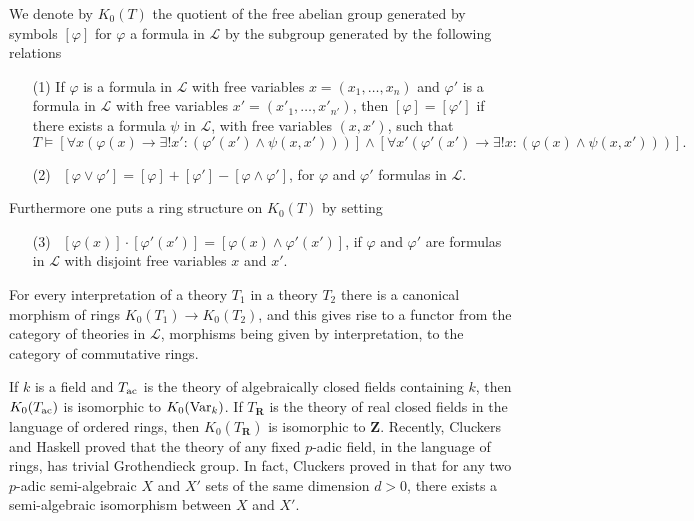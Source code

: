 \documentclass[english,12pt]{amsart}
\def\RR{{\mathbf R}}
\def\ZZ{{\mathbf Z}}
\def\cL{{\mathcal L}}
\theoremstyle{definition}
\theoremstyle{remark}
\theoremstyle{plain}
\numberwithin{equation}{subsection}
\def\RR{{\mathbf R}}
\def\ZZ{{\mathbf Z}}
\def\cL{{\mathcal L}}
\begin{document}
We denote by $K_{0} (T)$ the quotient of the
free abelian group generated by
symbols $[\varphi]$ for $\varphi$ a formula in $\cL$
by the subgroup generated by the following
relations~
\begin{enumerate}
\item[(1)] If $\varphi$ is a formula in $\cL$ with free variables
$x = (x_{1}, \ldots, x_{n})$ and
$\varphi'$ is a formula in $\cL$ with free variables
$x' = (x'_{1}, \ldots, x'_{n'})$, then
$[\varphi] = [\varphi']$ if there exists a formula
$\psi$ in $\cL$, with free variables
$(x, x')$,
such that
$$
T \models [\forall x (\varphi (x) \rightarrow \exists! x' : (\varphi' (x')
\wedge \psi (x, x')))]
\wedge
[\forall x' (\varphi' (x') \rightarrow \exists! x : (\varphi (x)
\wedge \psi (x, x')))].$$
\item[(2)] \, $[\varphi \vee \varphi'] = [\varphi] + [\varphi'] - [\varphi
\wedge \varphi']$, for $\varphi$ and $\varphi'$  formulas in $\cL$.
\end{enumerate}
Furthermore one puts a ring structure on 
$K_{0} (T)$ by setting
\begin{enumerate}
\item[(3)] \, $[\varphi (x) ] \cdot [\varphi' (x')] =
[\varphi (x) \wedge  \varphi' (x')] $, if
$\varphi$ and $\varphi'$  are formulas in $\cL$ with disjoint free
variables $x$ and $x'$.
\end{enumerate}



For every interpretation of a theory $T_{1}$ in a theory
$T_{2}$ there is  a canonical morphism of rings
$K_{0} (T_{1}) \rightarrow K_{0} (T_{2})$, and this gives rise to a functor
from the category of theories in $\cL$, morphisms being given by
interpretation, to the category of commutative rings.



\medskip


If $k$ is a field and $T_{\rm ac}$ is 
the theory of algebraically closed fields containing $k$,
then $K_{0} (T_{\rm ac})$ is isomorphic to $K_{0} ({\rm Var}_k)$. If
$T_{\RR}$ is the theory
of real closed fields in the language of ordered rings, 
then $K_{0} (T_{\RR})$ is isomorphic to $\ZZ$.
Recently, Cluckers and Haskell \cite{CH} proved that the theory of
any fixed $p$-adic field, in the language of rings,
has trivial Grothendieck group.
In fact, Cluckers proved in \cite{raf} that for any two
$p$-adic semi-algebraic $X$ and $X'$
sets of the same dimension $d > 0$, there exists a semi-algebraic isomorphism
between $X$ and $X'$.
\end{document}

